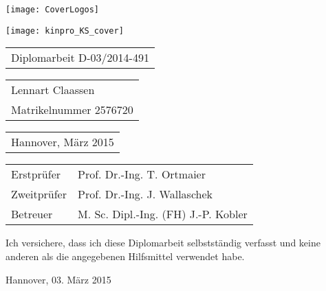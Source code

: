 \begin{titlepage}
\begin{spacing}{2}

\begin{flushright} %
	\vspace*{-20mm}
	\texttt{[image: CoverLogos]}
\end{flushright} %

\vspace{38mm} {

\vfill
\vspace{3mm}
\texttt{[image: kinpro\_KS\_cover]}

\vfill }
\end{spacing}
\begin{spacing}{1}
\begin{tabular}{l}
 \Large{Diplomarbeit D-03/2014-491}
\end{tabular}

\vspace{5mm}

\begin{tabular}{l}
\large{Lennart Claassen}\\
\large{Matrikelnummer 2576720}
\end{tabular}

\vspace{5mm}

\begin{tabular}{l}
\large{Hannover, März 2015}
\end{tabular}


\vspace{5mm}
{\large
\begin{tabular}{l l}
Erstprüfer  & Prof. Dr.-Ing. T. Ortmaier\\
Zweitprüfer & Prof. Dr.-Ing. J. Wallaschek\\
Betreuer    & M. Sc. Dipl.-Ing. (FH) J.-P. Kobler\\
\end{tabular}
}

\end{spacing}
\end{titlepage}




%
%
%


\noindent Ich versichere, dass ich diese Diplomarbeit selbstständig
verfasst und keine anderen als die angegebenen Hilfsmittel verwendet
habe.

\vspace{25mm}

\noindent Hannover, 03. März 2015
\newpage
